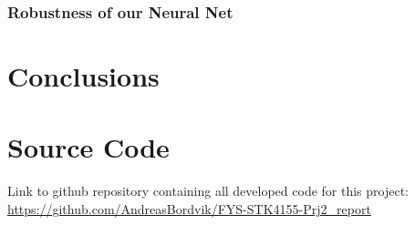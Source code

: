\documentclass
[twocolumn,
secnumarabic,
nobibnotes,
aps,
prl,
reprint,
groupedaddress,
amsmath,
amssymb
]{revtex4-2}
\begin{document}
\subsubsection{Robustness of our Neural Net}






\section{Conclusions}

\appendix

\section{Source Code}
\label{sec:sc}
Link to github repository containing all developed code for this project: \url{https://github.com/AndreasBordvik/FYS-STK4155-Prj2_report}





\end{document}
